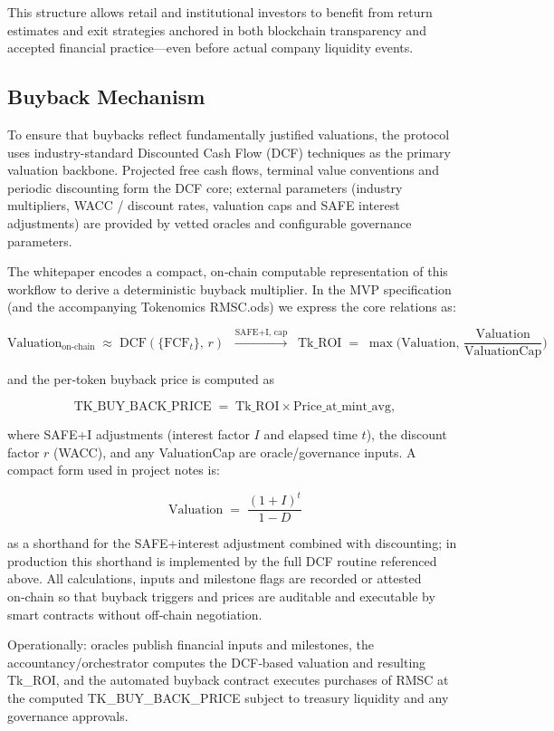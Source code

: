 \documentclass[conference]{IEEEtran}
\begin{document}
This structure allows retail and institutional investors to benefit from return estimates and exit strategies anchored in both blockchain transparency and accepted financial practice—even before actual company liquidity events.

\subsection{Buyback Mechanism}
To ensure that buybacks reflect fundamentally justified valuations, the protocol uses industry-standard Discounted Cash Flow (DCF) techniques as the primary valuation backbone. Projected free cash flows, terminal value conventions and periodic discounting form the DCF core; external parameters (industry multipliers, WACC / discount rates, valuation caps and SAFE interest adjustments) are provided by vetted oracles and configurable governance parameters.

The whitepaper encodes a compact, on‑chain computable representation of this workflow to derive a deterministic buyback multiplier. In the MVP specification (and the accompanying Tokenomics RMSC.ods) we express the core relations as:

\[
\text{Valuation}_{\text{on‑chain}} \;\approx\; \text{DCF}(\{\text{FCF}_t\},\,r) \;\;\xrightarrow{\text{SAFE+I, cap}}\;\;
\text{Tk\_ROI} \;=\; \max\!\Big(\text{Valuation},\,\frac{\text{Valuation}}{\text{ValuationCap}}\Big)
\]

and the per‑token buyback price is computed as

\[
\text{TK\_BUY\_BACK\_PRICE} \;=\; \text{Tk\_ROI}\times\text{Price\_at\_mint\_avg},
\]

where SAFE+I adjustments (interest factor \(I\) and elapsed time \(t\)), the discount factor \(r\) (WACC), and any ValuationCap are oracle/governance inputs. A compact form used in project notes is:

\[
\text{Valuation} \;=\; \frac{(1+I)^{t}}{1-D}
\]

as a shorthand for the SAFE+interest adjustment combined with discounting; in production this shorthand is implemented by the full DCF routine referenced above. All calculations, inputs and milestone flags are recorded or attested on‑chain so that buyback triggers and prices are auditable and executable by smart contracts without off‑chain negotiation.

Operationally: oracles publish financial inputs and milestones, the accountancy/orchestrator computes the DCF‑based valuation and resulting Tk_ROI, and the automated buyback contract executes purchases of RMSC at the computed TK_BUY_BACK_PRICE subject to treasury liquidity and any governance approvals.
\end{document}
